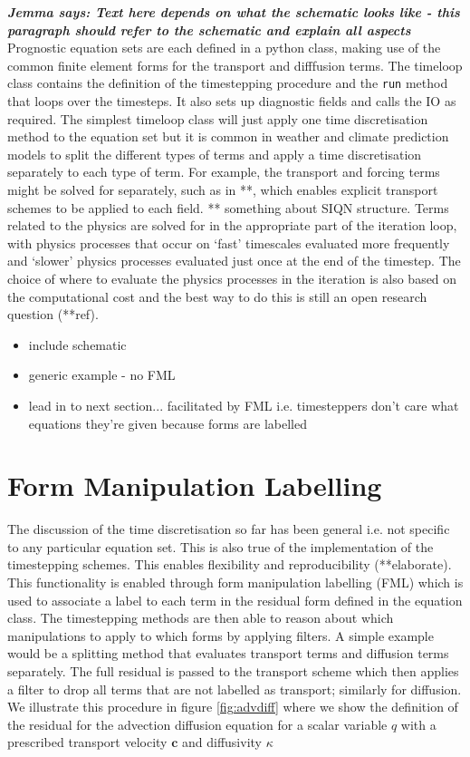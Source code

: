 \documentclass[journal abbreviation, manuscript]{copernicus}
\def\MM#1{\boldsymbol{#1}}
\newcommand{\JScomment}[1]{\textit{\textbf{Jemma says: #1}}}
\begin{document}
\JScomment{Text here depends on what the schematic looks like - this
  paragraph should refer to the schematic and explain all aspects}
Prognostic equation sets are each defined in a python class, making
use of the common finite element forms for the transport and
difffusion terms. The timeloop class contains the definition of the
timestepping procedure and the \texttt{run} method that loops over the
timesteps. It also sets up diagnostic fields and calls the IO as
required. The simplest timeloop class will just apply one time
discretisation method to the equation set but it is common in weather
and climate prediction models to split the different types of terms
and apply a time discretisation separately to each type of term. For
example, the transport and forcing terms might be solved for
separately, such as in **, which enables explicit transport schemes to
be applied to each field. ** something about SIQN structure. Terms
related to the physics are solved for in the appropriate part of the
iteration loop, with physics processes that occur on `fast' timescales
evaluated more frequently and `slower' physics processes evaluated
just once at the end of the timestep. The choice of where to evaluate
the physics processes in the iteration is also based on the
computational cost and the best way to do this is still an open
research question (**ref).

\begin{itemize}
\item include schematic
\item generic example - no FML
\item lead in to next section... facilitated by FML i.e. timesteppers don't care what equations they're given because forms are labelled
\end{itemize}

\section{Form Manipulation Labelling}
\label{sec: FML}
The discussion of the time discretisation so far has been general i.e.
not specific to any particular equation set. This is also true of the
implementation of the timestepping schemes. This enables flexibility
and reproducibility (**elaborate). This functionality is enabled
through form manipulation labelling (FML) which is used to associate a
label to each term in the residual form defined in the equation
class. The timestepping methods are then able to reason about which
manipulations to apply to which forms by applying filters. A simple
example would be a splitting method that evaluates transport terms and
diffusion terms separately. The full residual is passed to the
transport scheme which then applies a filter to drop all terms that
are not labelled as transport; similarly for diffusion. We illustrate
this procedure in figure \ref{fig:advdiff} where we show the
definition of the residual for the advection diffusion equation for a
scalar variable $q$ with a prescribed transport velocity $\MM{c}$ and
diffusivity $\kappa$
\end{document}

